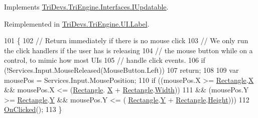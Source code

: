 Implements \hyperlink{interface_tri_devs_1_1_tri_engine_1_1_interfaces_1_1_i_updatable_a5392174d0eb92b04a0ef1908ce725f29}{Tri\-Devs.\-Tri\-Engine.\-Interfaces.\-I\-Updatable}.



Reimplemented in \hyperlink{class_tri_devs_1_1_tri_engine_1_1_u_i_1_1_label_a542e0fda292f3bcbf9faad474480e007}{Tri\-Devs.\-Tri\-Engine.\-U\-I.\-Label}.


\begin{DoxyCode}
101         \{
102             \textcolor{comment}{// Return immediately if there is no mouse click}
103             \textcolor{comment}{// We only run the click handlers if the user has is releasing}
104             \textcolor{comment}{// the mouse button while on a control, to mimic how most UIs}
105             \textcolor{comment}{// handle click events.}
106             \textcolor{keywordflow}{if} (!Services.Input.MouseReleased(MouseButton.Left))
107                 \textcolor{keywordflow}{return};
108 
109             var mousePos = Services.Input.MousePosition;
110             \textcolor{keywordflow}{if} ((mousePos.X >= \hyperlink{class_tri_devs_1_1_tri_engine_1_1_u_i_1_1_control_ab9544a7d5067f97206752c1af74ae359}{Rectangle}.\hyperlink{struct_tri_devs_1_1_tri_engine_1_1_rectangle_a7aa76fc1fe420a06617ed0642f4aaca0}{X} && mousePos.X <= (\hyperlink{class_tri_devs_1_1_tri_engine_1_1_u_i_1_1_control_ab9544a7d5067f97206752c1af74ae359}{Rectangle}.
      \hyperlink{struct_tri_devs_1_1_tri_engine_1_1_rectangle_a7aa76fc1fe420a06617ed0642f4aaca0}{X} + \hyperlink{class_tri_devs_1_1_tri_engine_1_1_u_i_1_1_control_ab9544a7d5067f97206752c1af74ae359}{Rectangle}.\hyperlink{struct_tri_devs_1_1_tri_engine_1_1_rectangle_a290425f699b44898216275f26b585bf0}{Width}))
111                 && (mousePos.Y >= \hyperlink{class_tri_devs_1_1_tri_engine_1_1_u_i_1_1_control_ab9544a7d5067f97206752c1af74ae359}{Rectangle}.\hyperlink{struct_tri_devs_1_1_tri_engine_1_1_rectangle_acca174d01cbb82151fc769fcaf7a97e4}{Y} && mousePos.Y <= (
      \hyperlink{class_tri_devs_1_1_tri_engine_1_1_u_i_1_1_control_ab9544a7d5067f97206752c1af74ae359}{Rectangle}.\hyperlink{struct_tri_devs_1_1_tri_engine_1_1_rectangle_acca174d01cbb82151fc769fcaf7a97e4}{Y} + \hyperlink{class_tri_devs_1_1_tri_engine_1_1_u_i_1_1_control_ab9544a7d5067f97206752c1af74ae359}{Rectangle}.\hyperlink{struct_tri_devs_1_1_tri_engine_1_1_rectangle_ab658107474a933269cab1d3dcbb46cf0}{Height})))
112                 \hyperlink{class_tri_devs_1_1_tri_engine_1_1_u_i_1_1_control_a7b320763bc664738c1a51fc2aaed4f41}{OnClicked}();
113         \}
\end{DoxyCode}



